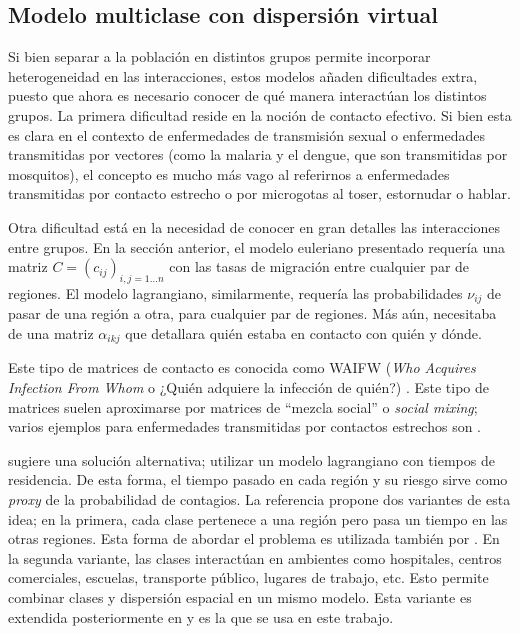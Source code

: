 \subsection{Modelo multiclase con dispersión virtual}\label{modelo-clases-vs-ambientes}

Si bien separar a la población en distintos grupos permite incorporar heterogeneidad en las interacciones, estos modelos añaden dificultades extra, puesto que ahora es necesario conocer de qué manera interactúan los distintos grupos. La primera dificultad reside en la noción de contacto efectivo. Si bien esta es clara en el contexto de enfermedades de transmisión sexual o enfermedades transmitidas por vectores (como la malaria y el dengue, que son transmitidas por mosquitos), el concepto es mucho más vago al referirnos a enfermedades transmitidas por contacto estrecho o por microgotas al toser, estornudar o hablar.

Otra dificultad está en la necesidad de conocer en gran detalles las interacciones entre grupos. En la sección anterior, el modelo euleriano presentado requería una matriz \(C = (c_{ij})_{i,j = 1 \dots n} \) con las tasas de migración entre cualquier par de regiones. El modelo lagrangiano, similarmente, requería las probabilidades \(\nu_{ij}\) de pasar de una región a otra, para cualquier par de regiones. Más aún, necesitaba de una matriz \(\alpha_{ikj}\) que detallara quién estaba en contacto con quién y dónde.

Este tipo de matrices de contacto es conocida como WAIFW (\textit{Who Acquires Infection From Whom} o  ¿Quién adquiere la infección de quién?) \cite{Anderson1992}. Este tipo de matrices suelen aproximarse por matrices de ``mezcla social'' o \textit{social mixing}; varios ejemplos para enfermedades transmitidas por contactos estrechos son \cite{Mossong2008}\cite{Wallinga2006}\cite{Edmunds2006}.

\cite{Bichara2015} sugiere una solución alternativa; utilizar un modelo lagrangiano con tiempos de residencia. De esta forma, el tiempo pasado en cada región y su riesgo sirve como \textit{proxy} de la probabilidad de contagios. La referencia \cite{Bichara2015} propone dos variantes de esta idea; en la primera, cada clase pertenece a una región pero pasa un tiempo en las otras regiones. Esta forma de abordar el problema es utilizada también por \cite{Cosner2009}. En la segunda variante, las clases interactúan en ambientes como hospitales, centros comerciales, escuelas, transporte público, lugares de trabajo, etc. Esto permite combinar clases y dispersión espacial en un mismo modelo. Esta variante es extendida posteriormente en \cite{Bichara2018} y es la que se usa en este trabajo.

